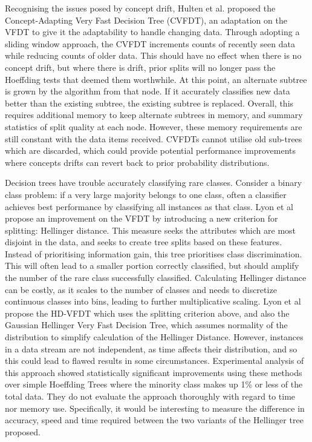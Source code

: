 \documentclass[10pt]{article}
\begin{document}
Recognising the issues posed by concept drift, Hulten et al. \cite{hul01} proposed the Concept-Adapting Very Fast Decision Tree (CVFDT), an adaptation on the VFDT to give it the adaptability to handle changing data. Through adopting a sliding window approach, the CVFDT increments counts of recently seen data while reducing counts of older data. This should have no effect when there is no concept drift, but where there is drift, prior splits will no longer pass the Hoeffding tests that deemed them worthwhile. At this point, an alternate subtree is grown by the algorithm from that node. If it accurately classifies new data better than the existing subtree, the existing subtree is replaced. Overall, this requires additional memory to keep alternate subtrees in memory, and summary statistics of split quality at each node. However, these memory requirements are still constant with the data items received. CVFDTs cannot utilise old sub-trees which are discarded, which could provide potential performance improvements where concepts drifts can revert back to prior probability distributions.

Decision trees have trouble accurately classifying rare classes. Consider a binary class problem: if a very large majority belongs to one class, often a classifier achieves best performance by classifying all instances as that class. Lyon et al \cite{lyo14} propose an improvement on the VFDT by introducing a new criterion for splitting: Hellinger distance. This measure seeks the attributes which are most disjoint in the data, and seeks to create tree splits based on these features. Instead of prioritising information gain, this tree prioritises class discrimination. This will often lead to a smaller portion correctly classified, but should amplify the number of the rare class successfully classified. Calculating Hellinger distance can be costly, as it scales to the number of classes and needs to discretize continuous classes into bins, leading to further multiplicative scaling. Lyon et al propose the HD-VFDT which uses the splitting criterion above, and also the Gaussian Hellinger Very Fast Decision Tree, which assumes normality of the distribution to simplify calculation of the Hellinger Distance. However, instances in a data stream are not independent, as time affects their distribution, and so this could lead to flawed results in some circumstances. Experimental analysis of this approach showed statistically significant improvements using these methods over simple Hoeffding Trees where the minority class makes up 1\% or less of the total data. They do not evaluate the approach thoroughly with regard to time nor memory use. Specifically, it would be interesting to measure the difference in accuracy, speed and time required between the two variants of the Hellinger tree proposed.
\end{document}

